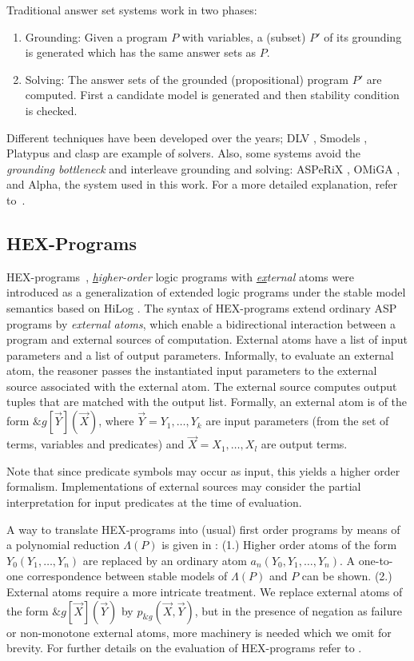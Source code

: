 Traditional answer set systems work in two phases:
\begin{enumerate}
\item Grounding: Given a program \(P\) with variables, a (subset) \(P'\) of its grounding is generated which has the same answer sets as \(P\).
\item Solving: The answer sets of the grounded (propositional) program \(P'\) are computed. First a candidate model is generated and then stability condition is checked.
\end{enumerate}

Different techniques have been developed over the years; DLV \cite{dlv}, Smodels \cite{smodels}, Platypus \cite{platypus} and clasp \cite{clasp} are example of solvers. Also, some systems avoid the \emph{grounding bottleneck} and interleave grounding and solving: ASPeRiX \cite{asperix,fofchain}, OMiGA \cite{omiga}, and Alpha, the system used in this work. For a more detailed explanation, refer to~\cite{primer,aspbook}.

\subsection{HEX-Programs}
HEX-programs~\cite{hex}, \emph{\underline{h}igher-order} logic programs with \emph{\underline{ex}ternal} atoms were introduced as a generalization of extended logic programs under the stable model semantics based on HiLog \cite{hilog}. The syntax of HEX-programs extend ordinary ASP programs by \emph{external atoms}, which enable a bidirectional interaction between a program and external sources of computation. External atoms have a list of input parameters and a list of output parameters. Informally, to evaluate an external atom, the reasoner passes the instantiated input parameters to the external source associated with the external atom. The external source computes output tuples that are matched with the output list. Formally, an external atom is of the form \(\&g[\vec{Y}](\vec{X})\), where \(\vec{Y} = Y_1, \dotso , Y_k\) are input parameters (from the set of terms, variables and predicates) and \(\vec{X} = X_1, \dotso , X_l \) are output terms.

Note that since predicate symbols may occur as input, this yields a higher order formalism. Implementations of external sources may consider the partial interpretation for input predicates at the time of evaluation.

A way to translate HEX-programs into (usual) first order programs by means of a polynomial reduction \(\Lambda(P)\) is given in \cite{hex}: (1.) Higher order atoms of the form \(Y_0(Y_1, \dotso, Y_n)\) are replaced by an ordinary atom \(a_n(Y_0, Y_1, \dotso, Y_n)\). A one-to-one correspondence between stable models of \(\Lambda(P)\) and \(P\) can be shown. (2.) External atoms require a more intricate treatment. We replace external atoms of the form \(\&g[\vec{X}](\vec{Y})\) by \(p_{\&g}(\vec{X},\vec{Y})\), but in the presence of negation as failure or non-monotone external atoms, more machinery is needed which we omit for brevity. For further details on the evaluation of HEX-programs refer to \cite{effeval1,effeval2}.